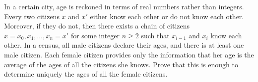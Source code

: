In a certain city, age is reckoned in terms of real numbers rather than integers. Every two citizens $x$ and $x'$ either know each other or do not know each other. Moreover, if they do not, then there exists a chain of citizens $x = x_0, x_1, \ldots, x_n = x'$ for some integer $n \geq 2$ such that $x_{i-1}$ and $x_i$ know each other. In a census, all male citizens declare their ages, and there is at least one male citizen. Each female citizen provides only the information that her age is the average of the ages of all the citizens she knows. Prove that this is enough to determine uniquely the ages of all the female citizens.
